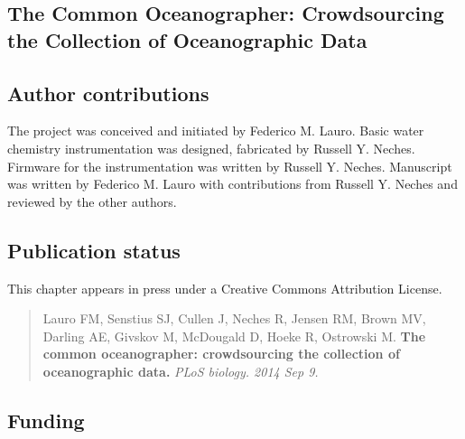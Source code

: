 \begin{refsection}

\chapter{The Common Oceanographer: Crowdsourcing the Collection of Oceanographic Data}


\section{Author contributions}

The project was conceived and initiated by Federico M. Lauro. Basic
water chemistry instrumentation was designed, fabricated by Russell Y.
Neches. Firmware for the instrumentation was written by Russell Y.
Neches. Manuscript was written by Federico M. Lauro with contributions
from Russell Y. Neches and reviewed by the other authors.

\clearpage

\section{Publication status}

This chapter appears in press under a Creative Commons Attribution
License.

\begin{quote}
Lauro FM, Senstius SJ, Cullen J, Neches R, Jensen RM, Brown MV, Darling AE, Givskov M, McDougald D, Hoeke R, Ostrowski M. {\bf The common oceanographer: crowdsourcing the collection of oceanographic data.}
\em{PLoS biology.} 2014 Sep 9.
\end{quote}










\section{Funding}


\end{refsection}
